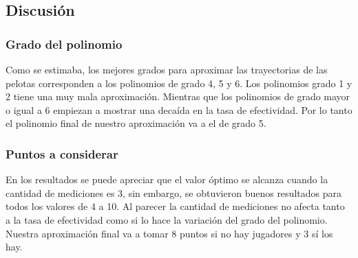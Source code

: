 \subsection{Discusión}
\subsubsection{Grado del polinomio}
Como se estimaba, los mejores grados para aproximar las trayectorias de las pelotas corresponden a los polinomios de grado 4, 5 y 6. Los polinomios grado 1 y 2 tiene una muy mala aproximación. Mientras que los polinomios de grado mayor o igual a 6 empiezan a mostrar una decaída en la tasa de efectividad. Por lo tanto el polinomio final de nuestro aproximación va a el de grado 5.

\subsubsection{Puntos a considerar}
En los resultados se puede apreciar que el valor óptimo se alcanza cuando la cantidad de mediciones es 3, sin embargo, se obtuvieron buenos resultados para todos los valores de 4 a 10. Al parecer la cantidad de mediciones no afecta tanto a la tasa de efectividad como si lo hace la variación del grado del polinomio. Nuestra aproximación final va a tomar 8 puntos si no hay jugadores y 3 sí los hay.


